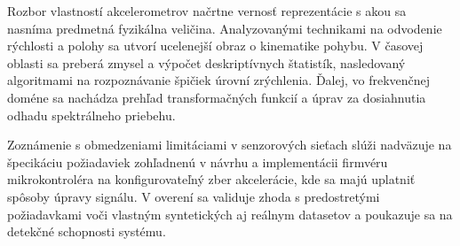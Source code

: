 Rozbor vlastností akcelerometrov načrtne vernosť reprezentácie s akou sa nasníma predmetná fyzikálna veličina.
Analyzovanými technikami na odvodenie rýchlosti a polohy sa utvorí ucelenejší obraz o kinematike pohybu.
V časovej oblasti sa preberá zmysel a výpočet deskriptívnych štatistík, nasledovaný algoritmami na rozpoznávanie špičiek
úrovní zrýchlenia. Ďalej, vo frekvenčnej doméne sa nachádza prehľad transformačných 
funkcií a úprav za dosiahnutia odhadu spektrálneho priebehu. 

Zoznámenie s obmedzeniami limitáciami v senzorových sieťach
slúži nadväzuje na špecikáciu požiadaviek zohľadnenú v návrhu a implementácii firmvéru mikrokontroléra na konfigurovateľný 
zber akcelerácie, kde sa majú uplatniť spôsoby úpravy signálu. V overení sa validuje zhoda s predostretými požiadavkami voči
vlastným syntetických aj reálnym datasetov a poukazuje sa na detekčné schopnosti systému.
